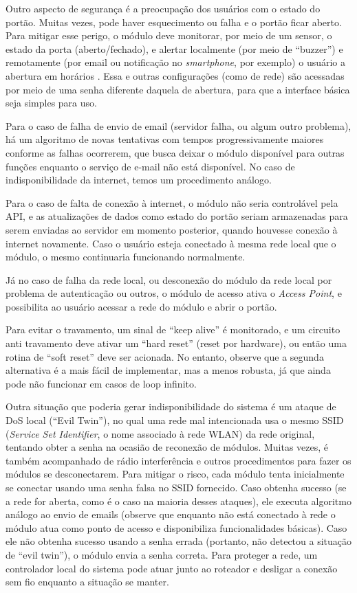 Outro aspecto de segurança é a preocupação dos usuários com o estado do portão. Muitas vezes, pode haver esquecimento ou falha e o portão ficar aberto. Para mitigar esse perigo, o módulo deve monitorar, por meio de um sensor, o estado da porta (aberto/fechado), e alertar localmente (por meio de “buzzer”) e remotamente (por email ou notificação no \textit{smartphone}, por exemplo) o usuário a abertura em horários . Essa e outras configurações (como de rede) são acessadas por meio de uma senha diferente daquela de abertura, para que a interface básica seja simples para uso.

Para o caso de falha de envio de email (servidor falha, ou algum outro problema), há um algoritmo de novas tentativas com tempos progressivamente maiores conforme as falhas ocorrerem, que busca deixar o módulo disponível para outras funções enquanto o serviço de e-mail não está disponível. No caso de indisponibilidade da internet, temos um procedimento análogo.

Para o caso de falta de conexão à internet, o módulo não seria controlável pela API, e as atualizações de dados como estado do portão seriam armazenadas para serem enviadas ao servidor em momento posterior, quando houvesse conexão à internet novamente. Caso o usuário esteja conectado à mesma rede local que o módulo, o mesmo continuaria funcionando normalmente.

Já no caso de falha da rede local, ou desconexão do módulo da rede local por problema de autenticação ou outros, o módulo de acesso ativa o \textit{Access Point}, e possibilita ao usuário acessar a rede do módulo e abrir o portão.

Para evitar o travamento, um sinal de “keep alive” é monitorado, e um circuito anti travamento deve ativar um “hard reset” (reset por hardware), ou então uma rotina de “soft reset” deve ser acionada. No entanto, observe que a segunda alternativa é a mais fácil de implementar, mas a menos robusta, já que ainda pode não funcionar em casos de loop infinito.

Outra situação que poderia gerar indisponibilidade do sistema é um ataque de DoS local (“Evil Twin”), no qual uma rede mal intencionada usa o mesmo SSID (\textit{Service Set Identifier}, o nome associado à rede WLAN) da rede original, tentando obter a senha na ocasião de reconexão de módulos. Muitas vezes, é também acompanhado de rádio interferência e outros procedimentos para fazer os módulos se desconectarem. Para mitigar o risco, cada módulo tenta inicialmente se conectar usando uma senha falsa no SSID fornecido. Caso obtenha sucesso (se a rede for aberta, como é o caso na maioria desses ataques), ele executa algoritmo análogo ao envio de emails (observe que enquanto não está conectado à rede o módulo atua como ponto de acesso e disponibiliza funcionalidades básicas). Caso ele não obtenha sucesso usando a senha errada (portanto, não detectou a situação de “evil twin”), o módulo envia a senha correta. Para proteger a rede, um controlador local do sistema pode atuar junto ao roteador e desligar a conexão sem fio enquanto a situação se manter.

